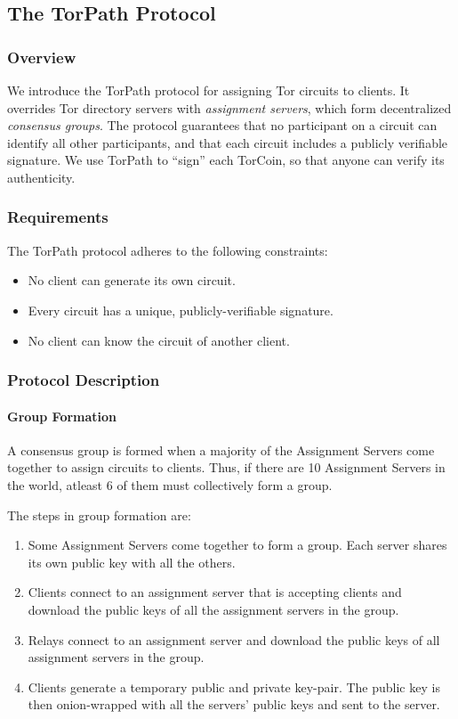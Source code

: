 \subsection{The TorPath Protocol}

\subsubsection{Overview}

We introduce the TorPath protocol for assigning Tor circuits to clients. It
overrides Tor directory servers with \textit{assignment servers}, which form
decentralized \textit{consensus groups}. The protocol guarantees that no
participant on a circuit can identify all other participants, and that each
circuit includes a publicly verifiable signature. We use TorPath to ``sign''
each TorCoin, so that anyone can verify its authenticity.

\subsubsection{Requirements}

The TorPath protocol adheres to the following constraints:

\begin{itemize}   
\item No client can generate its own circuit.   
\item Every circuit has a unique, publicly-verifiable signature.   
\item No client can know the circuit of another client. 
\end{itemize}

\subsubsection{Protocol Description}

\paragraph{Group Formation}

A consensus group is formed when a majority of the Assignment Servers come
together to assign circuits to clients. Thus, if there are 10 Assignment Servers
in the world, atleast 6 of them must collectively form a group.

The steps in group formation are: 
\begin{enumerate} 
\item Some Assignment Servers come together to form a group. Each server shares 
its own public key with all the others. 
\item Clients connect to an assignment server that is accepting clients and 
download the public keys of all the assignment servers in the group.
\item Relays connect to an assignment server and download the public
keys of all assignment servers in the group. 
\item Clients generate a temporary public and private key-pair. The public key 
is then onion-wrapped with all the servers' public keys and sent to the server.
\end{enumerate}

